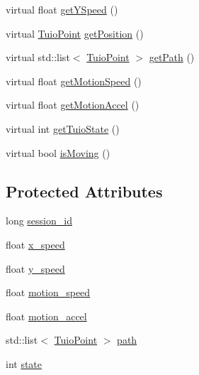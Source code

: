 \begin{DoxyCompactItemize}
\item 
virtual float \hyperlink{class_t_u_i_o_1_1_tuio_container_a2a7eb2f2a52fff82a36e818c61e76362}{get\+Y\+Speed} ()
\item 
virtual \hyperlink{class_t_u_i_o_1_1_tuio_point}{Tuio\+Point} \hyperlink{class_t_u_i_o_1_1_tuio_container_abbb93424274d67b2c30e757fd875af5f}{get\+Position} ()
\item 
virtual std\+::list$<$ \hyperlink{class_t_u_i_o_1_1_tuio_point}{Tuio\+Point} $>$ \hyperlink{class_t_u_i_o_1_1_tuio_container_a441c2b43473a13c686b9ccdce573f368}{get\+Path} ()
\item 
virtual float \hyperlink{class_t_u_i_o_1_1_tuio_container_ad8c0682163804a1f7e7e908d10272e20}{get\+Motion\+Speed} ()
\item 
virtual float \hyperlink{class_t_u_i_o_1_1_tuio_container_ac2a47a96b789844909b2fffd17a63f36}{get\+Motion\+Accel} ()
\item 
virtual int \hyperlink{class_t_u_i_o_1_1_tuio_container_aae941faa981d856324f596aab0e73cd1}{get\+Tuio\+State} ()
\item 
virtual bool \hyperlink{class_t_u_i_o_1_1_tuio_container_aa82c3733bc23cebe685ba73c7dc91df3}{is\+Moving} ()
\end{DoxyCompactItemize}
\subsection*{Protected Attributes}
\begin{DoxyCompactItemize}
\item 
long \hyperlink{class_t_u_i_o_1_1_tuio_container_ab8249dadd0e87ff0b93078b731bec603}{session\+\_\+id}
\item 
float \hyperlink{class_t_u_i_o_1_1_tuio_container_a5ee28d0495d5cc4fa331ed0b14b9e176}{x\+\_\+speed}
\item 
float \hyperlink{class_t_u_i_o_1_1_tuio_container_a2499ba8d5c0d8ca4afc3b55ddff4ff1a}{y\+\_\+speed}
\item 
float \hyperlink{class_t_u_i_o_1_1_tuio_container_a7810725234e427d4508f6b6a9874723b}{motion\+\_\+speed}
\item 
float \hyperlink{class_t_u_i_o_1_1_tuio_container_adaa20f12158aee41f7502da330f2a97e}{motion\+\_\+accel}
\item 
std\+::list$<$ \hyperlink{class_t_u_i_o_1_1_tuio_point}{Tuio\+Point} $>$ \hyperlink{class_t_u_i_o_1_1_tuio_container_a4bdb8935091e0736b6c19ce9fd676b9a}{path}
\item 
int \hyperlink{class_t_u_i_o_1_1_tuio_container_a61cfc66997d3d2f2a503e20bd29ddbf1}{state}
\end{DoxyCompactItemize}


